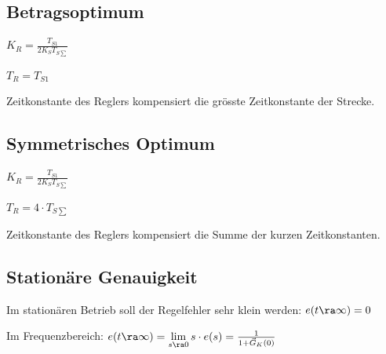 \documentclass[german]{latex4ei_fs}
\begin{document}
\begin{sectionbox}
\subsection{Betragsoptimum}
$K_R = \frac{T_{S1}}{2 K_S T_{S \sum}}$

$T_R = T_{S1}$

Zeitkonstante des Reglers kompensiert die grösste Zeitkonstante der Strecke.

\end{sectionbox}
\begin{sectionbox}
\subsection{Symmetrisches Optimum}
$K_R = \frac{T_{S1}}{2 K_S T_{S \sum}}$

$T_R = 4 \cdot T_{S \sum}$

Zeitkonstante des Reglers kompensiert die Summe der kurzen Zeitkonstanten.

\end{sectionbox}
\begin{sectionbox}

\subsection{Stationäre Genauigkeit} 

Im stationären Betrieb soll der Regelfehler sehr klein werden:
$e (t \ra \infty) = 0$

Im Frequenzbereich:
$e (t \ra \infty) = \lim \limits_{s \ra 0} s \cdot e(s) = \frac{1}{1 + \vec G_K (0)}$
\end{sectionbox}
\end{document}
